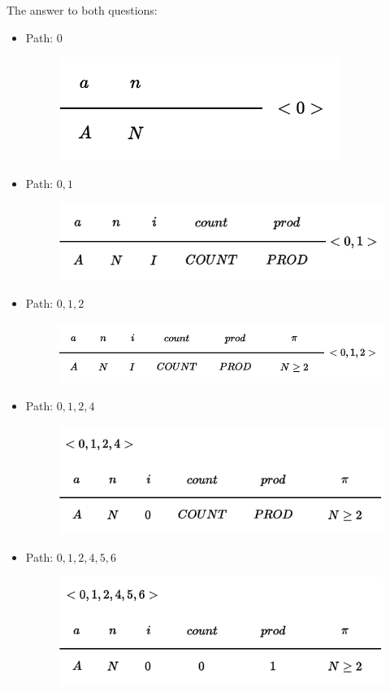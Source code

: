 \highspace
The answer to both questions:
\begin{itemize}
    \item Path: $0$
    \begin{figure}[!htp]
        \centering
        \includegraphics[width=.5\textwidth]{img/symbolic-execution-1.pdf}
    \end{figure}

    \newpage

    \item Path: $0, 1$
    \begin{figure}[!htp]
        \centering
        \includegraphics[width=.7\textwidth]{img/symbolic-execution-2.pdf}
    \end{figure}

    \item Path: $0, 1, 2$
    \begin{figure}[!htp]
        \centering
        \includegraphics[width=.7\textwidth]{img/symbolic-execution-3.pdf}
    \end{figure}

    \item Path: $0, 1, 2, 4$
    \begin{figure}[!htp]
        \centering
        \includegraphics[width=.7\textwidth]{img/symbolic-execution-4.pdf}
    \end{figure}

    \item Path: $0, 1, 2, 4, 5, 6$
    \begin{figure}[!htp]
        \centering
        \includegraphics[width=.7\textwidth]{img/symbolic-execution-5.pdf}
    \end{figure}
\end{itemize}

